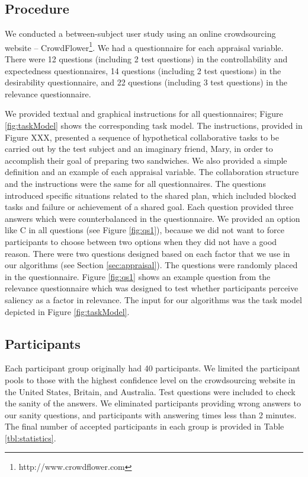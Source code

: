 \documentclass[12pt]{report}
\begin{document}
\subsection{Procedure}
 We conducted a between-subject user study using an online crowdsourcing website
 -- CrowdFlower\footnote{http://www.crowdflower.com}. We had a questionnaire for
 each appraisal variable. There were 12 questions (including 2 test questions)
 in the controllability and expectedness questionnaires, 14 questions (including
 2 test questions) in the desirability questionnaire, and 22 questions
 (including 3 test questions) in the relevance questionnaire.
 
We provided textual and graphical instructions for all questionnaires; Figure
\ref{fig:taskModel} shows the corresponding task model. The instructions,
provided in Figure XXX, presented a sequence of hypothetical collaborative tasks
to be carried out by the test subject and an imaginary friend, Mary, in order to
accomplish their goal of preparing two sandwiches. We also provided a simple
definition and an example of each appraisal variable. The collaboration
structure and the instructions were the same for all questionnaires. The
questions introduced specific situations related to the shared plan, which
included blocked tasks and failure or achievement of a shared goal. Each
question provided three answers which were counterbalanced in the questionnaire.
We provided an option like C in all questions (see Figure \ref{fig:qs1}),
because we did not want to force participants to choose between two options when
they did not have a good reason. There were two questions designed based on each
factor that we use in our algorithms (see Section \ref{sec:appraisal}). The
questions were randomly placed in the questionnaire. Figure \ref{fig:qs1} shows
an example question from the relevance questionnaire which was designed to test
whether participants perceive saliency as a factor in relevance. The input for
our algorithms was the task model depicted in Figure \ref{fig:taskModel}.

\subsection{Participants}
Each participant group originally had 40 participants. We limited the
participant pools to those with the highest confidence level on the
crowdsourcing website in the United States, Britain, and Australia. Test
questions were included to check the sanity of the answers. We eliminated
participants providing wrong answers to our sanity questions, and participants with
answering times less than 2 minutes. The final number of accepted participants
in each group is provided in Table \ref{tbl:statistics}.
\end{document}
